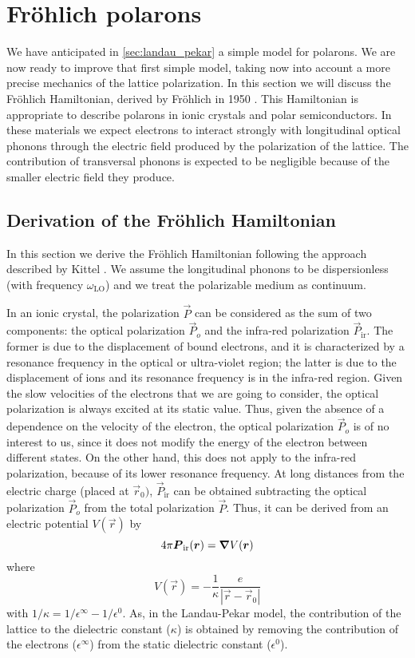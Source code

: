 \section{Fr\"{o}hlich polarons}
We have anticipated in \cref{sec:landau_pekar} a simple model for polarons. We are now ready to improve that first simple model, taking now into account a more precise mechanics of the lattice polarization. In this section we will discuss the Fr\"ohlich Hamiltonian, derived by Fr\"{o}hlich in 1950 \cite{frohlich1950}. This Hamiltonian is appropriate to describe polarons in ionic crystals and polar semiconductors. In these materials we expect electrons to interact strongly with longitudinal optical phonons through the electric field produced by the polarization of the lattice. The contribution of transversal phonons is expected to be negligible because of the smaller electric field they produce.

\subsection{Derivation of the Fr\"{o}hlich Hamiltonian}
In this section we derive the Fr\"{o}hlich Hamiltonian following the approach described by Kittel \cite{kittel1987}. We assume the longitudinal phonons to be dispersionless (with frequency $\omega_\text{LO}$) and we treat the polarizable medium as continuum.

In an ionic crystal, the polarization $\vec{P}$ can be considered as the sum of two components: the optical polarization $\vec{P}_o$ and the infra-red polarization $\vec{P}_\text{ir}$. The former is due to the displacement of bound electrons, and it is characterized by a resonance frequency in the optical or ultra-violet region; the latter is due to the displacement of ions and its resonance frequency is in the infra-red region. Given the slow velocities of the electrons that we are going to consider, the optical polarization is always excited at its static value. Thus, given the absence of a dependence on the velocity of the electron, the optical polarization $\vec{P}_o$ is of no interest to us, since it does not modify the energy of the electron between different states. On the other hand, this does not apply to the infra-red polarization, because of its lower resonance frequency. At long distances from the electric charge (placed at $\vec{r}_0)$, $\vec{P}_\text{ir}$ can be obtained subtracting the optical polarization $\vec{P}_o$ from the total polarization $\vec{P}$. Thus, it can be derived from an electric potential $V(\vec{r})$ by
\begin{equation} \label{eq:polarization_potential}
    4\pi\mathbf{\boldsymbol{P}}_\text{ir}(\mathbf{\boldsymbol{r}}) = \grad V(\mathbf{\boldsymbol{r}})
\end{equation}
where
\begin{equation}
    V(\vec{r}) = -\frac{1}{\kappa} \frac{e}{|\vec{r}-\vec{r}_0|}
\end{equation}
with $1/\kappa = 1 / \epsilon^\infty - 1/\epsilon^0$. As, in the Landau-Pekar model, the contribution of the lattice to the dielectric constant ($\kappa$) is obtained by removing the contribution of the electrons ($\epsilon^\infty$) from the static dielectric constant ($\epsilon^0$).


